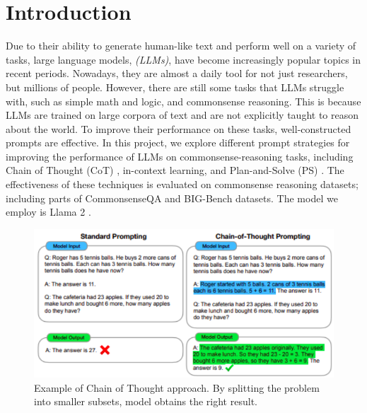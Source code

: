 \documentclass[fleqn,moreauthors,10pt]{ds_report}
\affiliation{\textit{Advisor: Assist. Aleš Žagar}}
\begin{document}
\flushbottom 

\maketitle 

\thispagestyle{empty} 


\section*{Introduction}
	Due to their ability to generate human-like text and perform well on a variety of tasks, large language models, \textit{(LLMs)}, have become increasingly popular topics in recent periods.
	Nowadays, they are almost a daily tool for not just researchers, but millions of people.
	However, there are still some tasks that LLMs struggle with, such as simple math and logic, and commonsense reasoning.
	This is because LLMs are trained on large corpora of text and are not explicitly taught to reason about the world. 
	To improve their performance on these tasks, well-constructed prompts are effective.
	In this project, we explore different prompt strategies for improving the performance of LLMs on commonsense-reasoning tasks, including Chain of Thought (CoT) \cite{CoT}, in-context learning, and Plan-and-Solve (PS) \cite{plan-and-solve}.
	The effectiveness of these techniques is evaluated on commonsense reasoning datasets; including parts of CommonsenseQA \cite{commonsenseqa} and BIG-Bench \cite{bigbench} datasets.
	The model we employ is Llama 2 \cite{llama2}.

\begin{figure}[H]
  \centering
  \includegraphics[width=1\linewidth]{fig/chain_of_thought.pdf} 
  \caption{Example of Chain of Thought approach. By splitting the problem into smaller subsets, model obtains the right result.}
  \label{fig:cot_example}
\end{figure}
\end{document}
